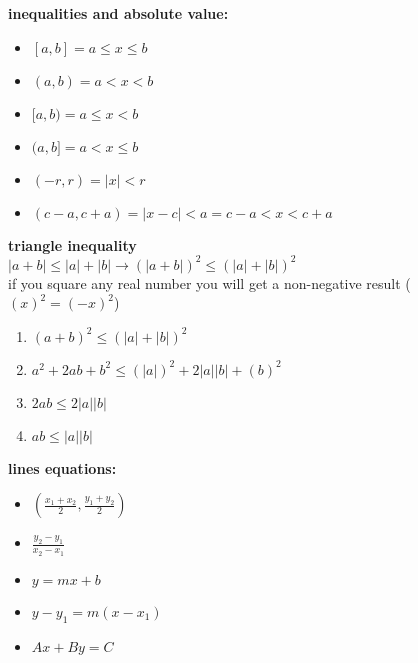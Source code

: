 \documentclass{article}
\begin{document}
\textbf{inequalities and absolute value:}
	\begin{itemize}	
		\item $[a, b] = a \leq x \leq b$
		\item $(a, b) = a < x < b$
		\item $[a, b) = a \leq x < b$
		\item $(a, b] = a < x \leq b$
		\item $(-r, r) = \lvert x\rvert < r$
		\item $(c - a, c + a) = \lvert x - c\rvert < a = c - a < x < c + a$
	\end{itemize}

\textbf{triangle inequality}\\

$\lvert a + b\rvert \leq \lvert a \rvert + \lvert b\rvert \to (\lvert a + b\rvert)^2 \leq (\lvert a \rvert + \lvert b\rvert)^2$\\

if you square any real number you will get a non-negative result ($(x)^2 = (-x)^2$)
	\begin{enumerate}
		\item $(a + b)^2 \leq (\lvert a\rvert + \lvert b\rvert)^2$
		\item $a^2 + 2ab + b^2 \leq (\lvert a\rvert)^2 + 2\lvert a\rvert\lvert b\rvert + (b)^2$
		\item $2ab \leq 2\lvert a\rvert\lvert b \rvert$
		\item $ab \leq \lvert a\rvert\lvert b\rvert$
	\end{enumerate}

\textbf{lines equations:}\\
	\begin{itemize}
		\item $(\frac{x_1 + x_2}{2}, \frac{y_1 + y_2}{2})$
		\item $\frac{y_2 - y_1}{x_2 - x_1}$
		\item $y = mx + b$
		\item $y - y_1 = m(x - x_1)$
		\item $Ax + By = C$ 
	\end{itemize}
\end{document}
